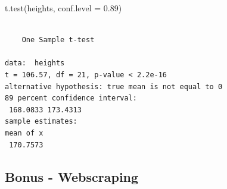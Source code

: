 \documentclass[
  letterpaper,
  DIV=11,
  numbers=noendperiod,
  oneside]{scrreprt}
\newenvironment{Shaded}{\begin{snugshade}}{\end{snugshade}}
\newcommand{\AttributeTok}[1]{\textcolor[rgb]{0.40,0.45,0.13}{#1}}
\newcommand{\FloatTok}[1]{\textcolor[rgb]{0.68,0.00,0.00}{#1}}
\newcommand{\FunctionTok}[1]{\textcolor[rgb]{0.28,0.35,0.67}{#1}}
\newcommand{\NormalTok}[1]{\textcolor[rgb]{0.00,0.23,0.31}{#1}}
\begin{document}
\begin{Shaded}
\begin{Highlighting}[]
\FunctionTok{t.test}\NormalTok{(heights, }\AttributeTok{conf.level =} \FloatTok{0.89}\NormalTok{)}
\end{Highlighting}
\end{Shaded}

\begin{verbatim}

    One Sample t-test

data:  heights
t = 106.57, df = 21, p-value < 2.2e-16
alternative hypothesis: true mean is not equal to 0
89 percent confidence interval:
 168.0833 173.4313
sample estimates:
mean of x 
 170.7573 
\end{verbatim}

\hypertarget{bonus---webscraping}{%
\subsection{Bonus - Webscraping}\label{bonus---webscraping}}
\end{document}
